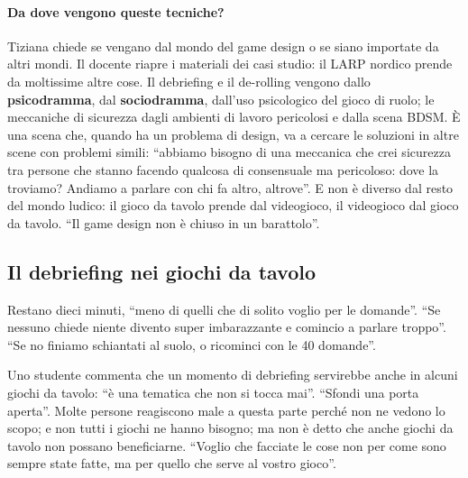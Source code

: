 \paragraph{Da dove vengono queste tecniche?} Tiziana chiede se vengano dal mondo del
game design o se siano importate da altri mondi. Il docente riapre i materiali dei
casi studio: il LARP nordico prende da moltissime altre cose. Il debriefing e il
de-rolling vengono dallo \textbf{psicodramma}, dal \textbf{sociodramma}, dall'uso
psicologico del gioco di ruolo; le meccaniche di sicurezza dagli ambienti di lavoro
pericolosi e dalla scena BDSM. È una scena che, quando ha un problema di design, va a
cercare le soluzioni in altre scene con problemi simili: ``abbiamo bisogno di una
meccanica che crei sicurezza tra persone che stanno facendo qualcosa di consensuale ma
pericoloso: dove la troviamo? Andiamo a parlare con chi fa altro, altrove''. E non è
diverso dal resto del mondo ludico: il gioco da tavolo prende dal videogioco, il
videogioco dal gioco da tavolo. ``Il game design non è chiuso in un barattolo''.

\subsection{Il debriefing nei giochi da tavolo}

Restano dieci minuti, ``meno di quelli che di solito voglio per le domande''. ``Se
nessuno chiede niente divento super imbarazzante e comincio a parlare troppo''. ``Se
no finiamo schiantati al suolo, o ricominci con le 40 domande''.

Uno studente commenta che un momento di debriefing servirebbe anche in alcuni giochi
da tavolo: ``è una tematica che non si tocca mai''. ``Sfondi una porta aperta''. Molte
persone reagiscono male a questa parte perché non ne vedono lo scopo; e non tutti i
giochi ne hanno bisogno; ma non è detto che anche giochi da tavolo non possano
beneficiarne. ``Voglio che facciate le cose non per come sono sempre state fatte, ma
per quello che serve al vostro gioco''.

